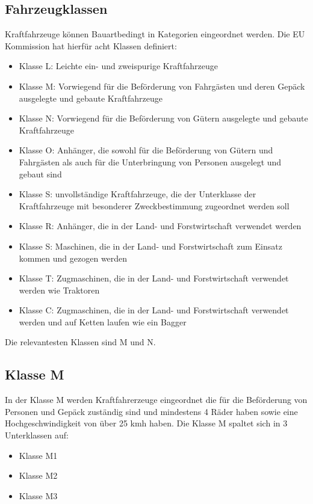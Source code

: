 \subsection{Fahrzeugklassen}

Kraftfahrzeuge können Bauartbedingt in Kategorien eingeordnet werden.
Die EU Kommission hat hierfür acht Klassen definiert\cite{VERORDNUNG}:

\begin{itemize}
	\item Klasse L: Leichte ein- und zweispurige Kraftfahrzeuge
	\item Klasse M: Vorwiegend für die Beförderung von Fahrgästen und deren Gepäck ausgelegte und gebaute Kraftfahrzeuge
	\item Klasse N: Vorwiegend für die Beförderung von Gütern ausgelegte und gebaute Kraftfahrzeuge
	\item Klasse O: Anhänger, die sowohl für die Beförderung von Gütern und Fahrgästen als auch für die Unterbringung von Personen ausgelegt und gebaut sind
	\item Klasse S: unvollständige Kraftfahrzeuge, die der Unterklasse der Kraftfahrzeuge mit besonderer Zweckbestimmung zugeordnet werden soll
	\item Klasse R: Anhänger, die in der Land- und Forstwirtschaft verwendet werden
	\item Klasse S: Maschinen, die in der Land- und Forstwirtschaft zum Einsatz kommen und gezogen werden
	\item Klasse T: Zugmaschinen, die in der Land- und Forstwirtschaft verwendet werden wie Traktoren
	\item Klasse C: Zugmaschinen, die in der Land- und Forstwirtschaft verwendet werden und auf Ketten laufen wie ein Bagger
\end{itemize}

Die relevantesten Klassen sind M und N.

\subsection*{Klasse M}
In der Klasse M werden Kraftfahrerzeuge eingeordnet die für die Beförderung von Personen und Gepäck zuständig sind und mindestens 4 Räder haben sowie eine Hochgeschwindigkeit von über 25 \ac{kmh} haben.
\newline
Die Klasse M spaltet sich in 3 Unterklassen auf:
\begin{itemize}
	\item {Klasse M1}
	\item {Klasse M2}
	\item {Klasse M3}
\end{itemize}

